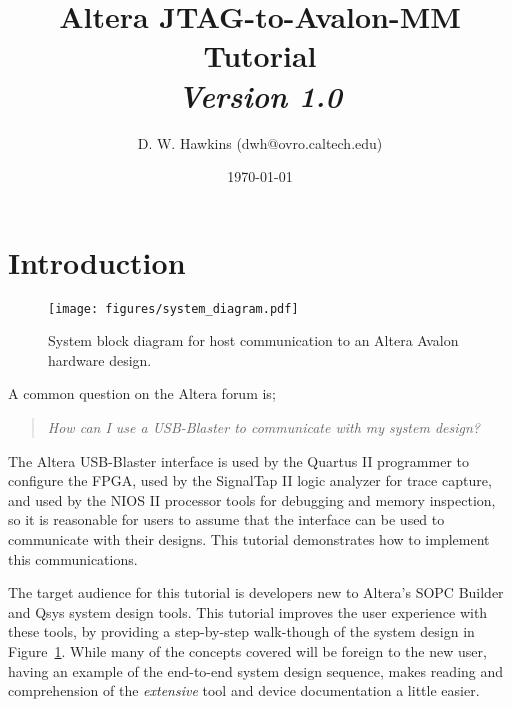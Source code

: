 \documentclass[10pt,twoside]{article}
\begin{document}
\title{Altera JTAG-to-Avalon-MM Tutorial\\
{\large \em Version 1.0}}
\author{D. W. Hawkins (dwh@ovro.caltech.edu)}
\date{\today}
\maketitle

\thispagestyle{empty}

\tableofcontents

\cleardoublepage

\pagestyle{fancy}
\chead{}
\rhead{\today}
\lfoot{}
\cfoot{}
\rfoot{\thepage}
\renewcommand{\headrulewidth}{0.4pt}
\renewcommand{\footrulewidth}{0.4pt}

\lstset{language=Tcl}

\section{Introduction}

\begin{figure}[t]
  \begin{center}
    \texttt{[image: figures/system\_diagram.pdf]}
  \end{center}
  \caption{System block diagram for host communication to an
  Altera Avalon hardware design.}
  \label{fig:system_diagram}
\end{figure}

A common question on the Altera forum is;
%
\begin{quote}
\em How can I use a USB-Blaster to communicate with my system design?
\end{quote}
%
The Altera USB-Blaster interface is used by the Quartus II
programmer to configure the FPGA, used by the SignalTap II logic 
analyzer for trace capture, and used by the NIOS II processor
tools for debugging and memory inspection, so it is reasonable
for users to assume that the interface can be used
to communicate with their designs. This tutorial demonstrates
how to implement this communications.

The target audience for this tutorial is developers new to Altera's 
SOPC Builder and Qsys system design tools.  This tutorial improves
the user experience with these tools, by providing a step-by-step
walk-though of the system design in Figure~\ref{fig:system_diagram}.
While many of the concepts covered will be foreign to the new user,
having an example of the end-to-end system design sequence, makes
reading and comprehension of the {\em extensive} tool and device 
documentation a little easier.
\end{document}
